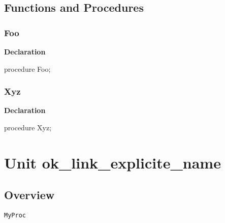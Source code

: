 \documentclass{report}
\begin{document}
\section{Functions and Procedures}
\subsection*{Foo}
\begin{list}{}{
\setlength{\itemindent}{0cm}
\setlength{\listparindent}{0cm}
\setlength{\leftmargin}{\evensidemargin}
\addtolength{\leftmargin}{\tmplength}
\settowidth{\labelsep}{X}
\addtolength{\leftmargin}{\labelsep}
\setlength{\labelwidth}{\tmplength}
}
\begin{flushleft}
\item[\textbf{Declaration}\hfill]
\begin{ttfamily}
procedure Foo;\end{ttfamily}


\end{flushleft}
\end{list}
\subsection*{Xyz}
\begin{list}{}{
\setlength{\itemindent}{0cm}
\setlength{\listparindent}{0cm}
\setlength{\leftmargin}{\evensidemargin}
\addtolength{\leftmargin}{\tmplength}
\settowidth{\labelsep}{X}
\addtolength{\leftmargin}{\labelsep}
\setlength{\labelwidth}{\tmplength}
}
\begin{flushleft}
\item[\textbf{Declaration}\hfill]
\begin{ttfamily}
procedure Xyz;\end{ttfamily}


\end{flushleft}
\end{list}
\chapter{Unit ok{\_}link{\_}explicite{\_}name}
\section{Overview}
\begin{description}
\item[\texttt{\begin{ttfamily}TTestingClass\end{ttfamily} Class}]
\end{description}
\begin{description}
\item[\texttt{MyProc}]
\end{description}
\end{document}
